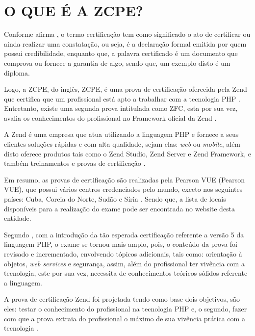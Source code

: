\chapter{O QUE É A ZCPE?}
\label{zcpe}

Conforme afirma , o termo certificação tem como
significado o ato de certificar ou ainda realizar uma constatação, ou seja, é a
declaração formal emitida por quem possui credibilidade, enquanto que, a palavra
certificado é um documento que comprova ou fornece a garantia de algo, sendo
que, um exemplo disto é um diploma.

Logo, a \acs{ZCPE}, do inglês, \acl{ZCPE}, é uma prova de certificação oferecida
pela \acs{Zend} que certifica que um profissional está apto a trabalhar com a
tecnologia \acs{PHP} \cite{websiteZendZCPE}. Entretanto, existe uma segunda
prova  intitulada como \ac{ZFC}, esta por sua vez, avalia os conhecimentos do 
profissional no Framework oficial da \acs{Zend} \cite{websiteZendZFC}.

A \acs{Zend} é uma empresa que atua utilizando a linguagem \acs{PHP} e fornece
a seus clientes soluções rápidas e com alta qualidade, sejam elas:  \textit{web}
ou \textit{mobile}, além disto oferece produtos tais como o \acs{Zend Studio},
\acs{Zend Server} e \acs{Zend Framework}, e também treinamentos e provas de
certificação \cite{websiteZendCompany}.

Em resumo, as provas de certificação são realizadas pela \acs{Pearson VUE}
(\acl{Pearson VUE}), que possui vários centros credenciados pelo mundo,  exceto
nos seguintes países: Cuba, Coreia do Norte, Sudão e Síria
\cite{websiteZendZFC}. Sendo que, a lista de locais disponíveis para a
realização do exame pode ser encontrada no website desta entidade.

Segundo , com a introdução da tão
esperada certificação referente a versão 5 da linguagem \acs{PHP}, o exame se
tornou mais amplo, pois, o conteúdo da prova foi revisado e incrementado,
envolvendo  tópicos adicionais, tais como: orientação à objetos, \textit{web
services} e segurança, assim, além do profissional ter vivência com a
tecnologia, este por sua vez, necessita de conhecimentos teóricos sólidos
referente a linguagem.

A prova de certificação \acs{Zend} foi projetada tendo como base dois objetivos, são
eles: testar o conhecimento do profissional na tecnologia \acs{PHP} e, o
segundo, fazer com que a prova extraia do profissional o máximo de sua vivência
prática com a tecnologia \cite{theZendPHPCertificationPracticeTestBook}.

